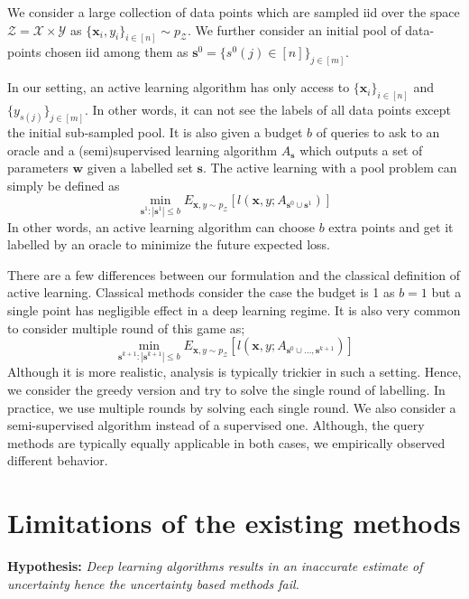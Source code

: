 \documentclass{article}
\begin{document}
We consider a large collection of data points which are sampled iid over the space  $\mathcal{Z}=\mathcal{X}\times\mathcal{Y}$ as \mbox{$\{\mathbf{x}_i,y_i\}_{i \in [n]} \sim p_\mathcal{Z}$}. We further consider an initial pool of data-points chosen iid among them as \mbox{$\mathbf{s}^0=\{s^0(j) \in [n]\}_{j \in [m]}$}. 

In our setting, an active learning algorithm has only access to $\{\mathbf{x}_i\}_{i \in [n]}$ and $\{y_{s(j)}\}_{j \in [m] }$. In other words, it can not see the labels of all data points except the initial sub-sampled pool. It is also given a budget $b$ of queries to ask to an oracle and a (semi)supervised learning algorithm $A_{\mathbf{s}}$ which outputs a set of parameters $\mathbf{w}$ given a labelled set $\mathbf{s}$. The active learning with a pool problem can simply be defined as
\begin{equation}
\min_{\mathbf{s}^1 : |\mathbf{s}^1| \leq b} E_{\mathbf{x},y \sim p_\mathcal{Z}} [l(\mathbf{x},y; A_{\mathbf{s}^0 \cup \mathbf{s}^1})]
\end{equation}
In other words, an active learning algorithm can choose $b$ extra points and get it labelled by an oracle to minimize the future expected loss.

There are a few differences between our formulation and the classical definition of active learning. Classical methods consider the case the budget is 1 as $b=1$ but a single point has negligible effect in a deep learning regime. It is also very common to consider multiple round of this game as;
\begin{equation}
\min_{\mathbf{s}^{k+1} : |\mathbf{s}^{k+1}| \leq b} E_{\mathbf{x},y \sim p_\mathcal{Z}} [l(\mathbf{x},y; A_{\mathbf{s}^{0} \cup \ldots, \mathbf{s}^{k+1}})]
\end{equation}
Although it is more realistic, analysis is typically trickier in such a setting. Hence, we consider the greedy version and try to solve the single round of labelling. In practice, we use multiple rounds by solving each single round. We also consider a semi-supervised algorithm instead of a supervised one. Although, the query methods are typically equally applicable in both cases, we empirically observed different behavior.

\section{Limitations of the existing methods}
\label{neg_res}
\noindent\textbf{Hypothesis:} \emph{Deep learning algorithms results in an inaccurate estimate of uncertainty hence the uncertainty based methods fail.}
\end{document}
